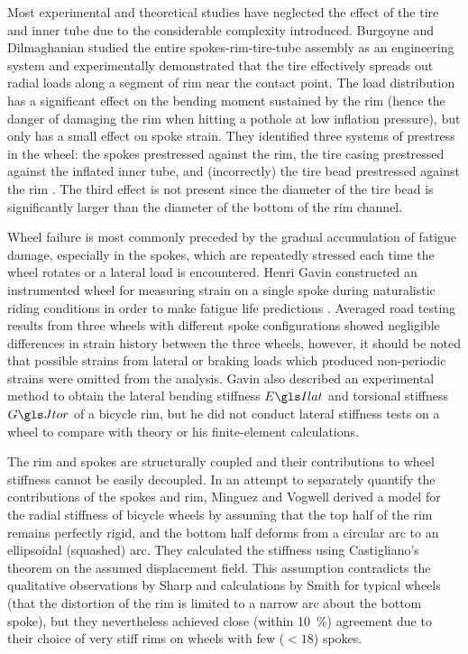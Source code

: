 \documentclass[../thesis.tex]{subfiles}
\begin{document}
Most experimental and theoretical studies have neglected the effect of the tire and inner tube due to the considerable complexity introduced. Burgoyne and Dilmaghanian \cite{Burgoyne1993} studied the entire spokes-rim-tire-tube assembly as an engineering system and experimentally demonstrated that the tire effectively spreads out radial loads along a segment of rim near the contact point. The load distribution has a significant effect on the bending moment sustained by the rim (hence the danger of damaging the rim when hitting a pothole at low inflation pressure), but only has a small effect on spoke strain. They identified three systems of prestress in the wheel: the spokes prestressed against the rim, the tire casing prestressed against the inflated inner tube, and (incorrectly) the tire bead prestressed against the rim \cite{Papadopoulos1995}. The third effect is not present since the diameter of the tire bead is significantly larger than the diameter of the bottom of the rim channel.

Wheel failure is most commonly preceded by the gradual accumulation of fatigue damage, especially in the spokes, which are repeatedly stressed each time the wheel rotates or a lateral load is encountered. Henri Gavin constructed an instrumented wheel for measuring strain on a single spoke during naturalistic riding conditions in order to make fatigue life predictions \cite{Gavin1996}. Averaged road testing results from three wheels with different spoke configurations showed negligible differences in strain history between the three wheels, however, it should be noted that possible strains from lateral or braking loads which produced non-periodic strains were omitted from the analysis. Gavin also described an experimental method to obtain the lateral bending stiffness $\EIl$ and torsional stiffness $\GJ$ of a bicycle rim, but he did not conduct lateral stiffness tests on a wheel to compare with theory or his finite-element calculations.

The rim and spokes are structurally coupled and their contributions to wheel stiffness cannot be easily decoupled. In an attempt to separately quantify the contributions of the spokes and rim, Minguez and Vogwell \cite{Minguez2008} derived a model for the radial stiffness of bicycle wheels by assuming that the top half of the rim remains perfectly rigid, and the bottom half deforms from a circular arc to an ellipsoidal (squashed) arc. They calculated the stiffness using Castigliano's theorem on the assumed displacement field. This assumption contradicts the qualitative observations by Sharp and calculations by Smith for typical wheels (that the distortion of the rim is limited to a narrow arc about the bottom spoke), but they nevertheless achieved close (within \SI{10}{\percent}) agreement due to their choice of very stiff rims on wheels with few ($<18$) spokes.
\end{document}
